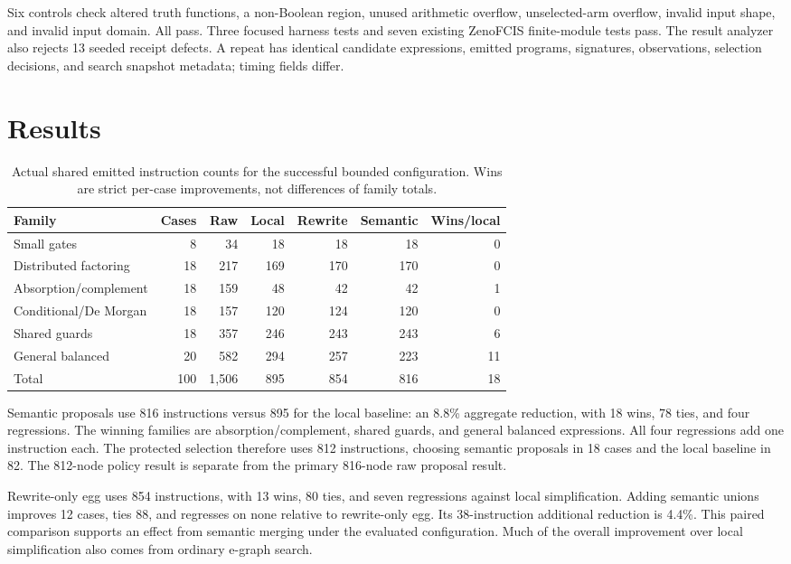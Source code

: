 \documentclass[11pt]{article}
\begin{document}
Six controls check altered truth functions, a non-Boolean region, unused
arithmetic overflow, unselected-arm overflow, invalid input shape, and invalid
input domain. All pass. Three focused harness tests and seven existing
ZenoFCIS finite-module tests pass. The result analyzer also rejects 13 seeded
receipt defects. A repeat has identical candidate expressions, emitted
programs, signatures, observations, selection decisions, and search snapshot
metadata; timing fields differ.

\section{Results}

\begin{table}[ht]
\centering
\small
\begin{tabular}{lrrrrrr}
\toprule
Family & Cases & Raw & Local & Rewrite & Semantic & Wins/local\\
\midrule
Small gates & 8 & 34 & 18 & 18 & 18 & 0\\
Distributed factoring & 18 & 217 & 169 & 170 & 170 & 0\\
Absorption/complement & 18 & 159 & 48 & 42 & 42 & 1\\
Conditional/De Morgan & 18 & 157 & 120 & 124 & 120 & 0\\
Shared guards & 18 & 357 & 246 & 243 & 243 & 6\\
General balanced & 20 & 582 & 294 & 257 & 223 & 11\\
\midrule
Total & 100 & 1,506 & 895 & 854 & 816 & 18\\
\bottomrule
\end{tabular}
\caption{Actual shared emitted instruction counts for the successful bounded
configuration. Wins are strict per-case improvements, not differences of
family totals.}
\label{tab:families}
\end{table}

Semantic proposals use 816 instructions versus 895 for the local baseline:
an 8.8\% aggregate reduction, with 18 wins, 78 ties, and four regressions.
The winning families are absorption/complement, shared guards, and general
balanced expressions. All four regressions add one instruction each. The
protected selection therefore uses 812 instructions, choosing semantic
proposals in 18 cases and the local baseline in 82. The 812-node policy result
is separate from the primary 816-node raw proposal result.

Rewrite-only egg uses 854 instructions, with 13 wins, 80 ties, and seven
regressions against local simplification. Adding semantic unions improves 12
cases, ties 88, and regresses on none relative to rewrite-only egg. Its
38-instruction additional reduction is 4.4\%. This paired comparison supports
an effect from semantic merging under the evaluated configuration.
Much of the overall improvement over local simplification also comes from
ordinary e-graph search.
\end{document}
